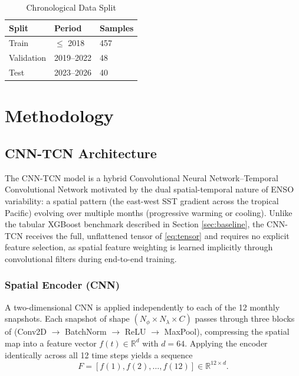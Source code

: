 \documentclass[conference]{IEEEtran}
\begin{document}
\begin{table}[t]
\centering
\caption{Chronological Data Split}
\label{tab:splits}
\begin{tabular}{@{}lll@{}}
\toprule
\textbf{Split} & \textbf{Period} & \textbf{Samples} \\
\midrule
Train & $\leq$ 2018 & 457 \\
Validation & 2019--2022 & 48 \\
Test & 2023--2026 & 40 \\
\bottomrule
\end{tabular}
\end{table}

\section{Methodology}

\subsection{CNN-TCN Architecture}
The CNN-TCN model is a hybrid Convolutional Neural Network--Temporal Convolutional Network motivated by the dual spatial-temporal nature of ENSO variability: a spatial pattern (the east-west SST gradient across the tropical Pacific) evolving over multiple months (progressive warming or cooling). Unlike the tabular XGBoost benchmark described in Section \ref{sec:baseline}, the CNN-TCN receives the full, unflattened tensor of \eqref{eq:tensor} and requires no explicit feature selection, as spatial feature weighting is learned implicitly through convolutional filters during end-to-end training.

\subsubsection{Spatial Encoder (CNN)}
A two-dimensional CNN is applied independently to each of the 12 monthly snapshots. Each snapshot of shape $(N_\phi\times N_\lambda\times C)$ passes through three blocks of (Conv2D $\rightarrow$ BatchNorm $\rightarrow$ ReLU $\rightarrow$ MaxPool), compressing the spatial map into a feature vector $f(t)\in\mathbb{R}^{d}$ with $d=64$. Applying the encoder identically across all 12 time steps yields a sequence
\begin{equation}
F = [f(1), f(2), \ldots, f(12)] \in \mathbb{R}^{12\times d}.
\label{eq:spatialseq}
\end{equation}
\end{document}
